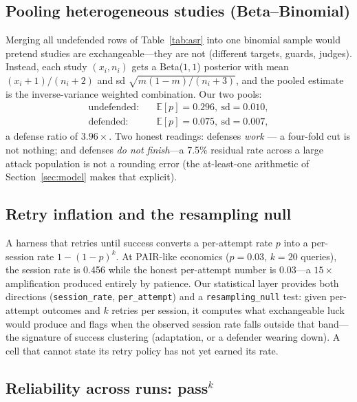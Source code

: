 \subsection{Pooling heterogeneous studies (Beta--Binomial)}\label{sec:pooling}

Merging all undefended rows of Table~\ref{tab:asr} into one binomial sample would
pretend studies are exchangeable---they are not (different targets, guards,
judges). Instead, each study $(x_i, n_i)$ gets a Beta($1,1$) posterior with mean
$(x_i{+}1)/(n_i{+}2)$ and sd $\sqrt{m(1-m)/(n_i{+}3)}$, and the pooled estimate
is the inverse-variance weighted combination. Our two pools:
\begin{align}
\text{undefended:}\quad & \mathbb{E}[p] = 0.296,\ \text{sd} = 0.010,\\
\text{defended:}\quad   & \mathbb{E}[p] = 0.075,\ \text{sd} = 0.007,
\end{align}
a defense ratio of $3.96\times$. Two honest readings: defenses \emph{work} ---
a four-fold cut is not nothing; and defenses \emph{do not finish}---a 7.5\%
residual rate across a large attack population is not a rounding error (the
at-least-one arithmetic of Section~\ref{sec:model} makes that explicit).

\subsection{Retry inflation and the resampling null}\label{sec:retry}

A harness that retries until success converts a per-attempt rate $p$ into a
per-session rate $1-(1-p)^k$. At PAIR-like economics ($p=0.03$, $k=20$ queries),
the session rate is 0.456 while the honest per-attempt number is 0.03---a
$15\times$ amplification produced entirely by patience. Our statistical layer
provides both directions (\texttt{session\_rate}, \texttt{per\_attempt}) and a
\texttt{resampling\_null} test: given per-attempt outcomes and $k$ retries per
session, it computes what exchangeable luck would produce and flags when the
observed session rate falls outside that band---the signature of success
clustering (adaptation, or a defender wearing down). A cell that cannot state
its retry policy has not yet earned its rate.

\subsection{Reliability across runs: pass$^k$}\label{sec:passk}

